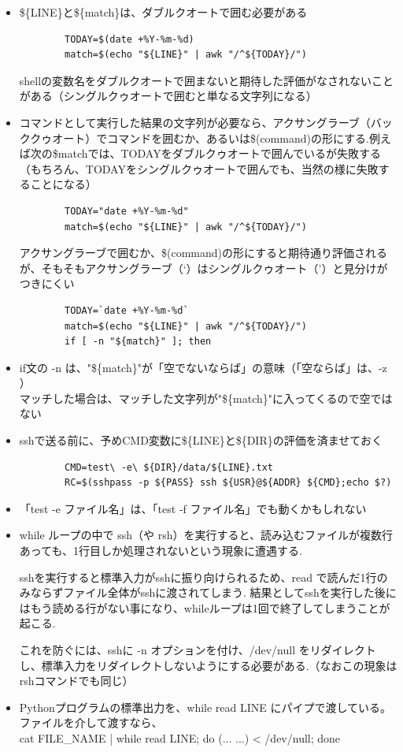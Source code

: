 \documentclass[12pt,a4paper,uplatex]{jsarticle}
\begin{document}
\begin{itemize}
	\item \$\{LINE\}と\$\{match\}は、ダブルクオートで囲む必要がある	
	\begin{verbatim}
		TODAY=$(date +%Y-%m-%d)
		match=$(echo "${LINE}" | awk "/^${TODAY}/")
	\end{verbatim}
	shellの変数名をダブルクオートで囲まないと期待した評価がなされないことがある（シングルクゥオートで囲むと単なる文字列になる）
	\item コマンドとして実行した結果の文字列が必要なら、アクサングラーブ（バッククゥオート）でコマンドを囲むか、あるいは\$(command)の形にする.例えば次の\${match}では、TODAYをダブルクゥオートで囲んでいるが失敗する（もちろん、TODAYをシングルクゥオートで囲んでも、当然の様に失敗することになる）
	\begin{verbatim}
		TODAY="date +%Y-%m-%d"
		match=$(echo "${LINE}" | awk "/^${TODAY}/")
	\end{verbatim}
	アクサングラーブで囲むか、\$(command)の形にすると期待通り評価されるが、そもそもアクサングラーブ（`）はシングルクゥオート（'）と見分けがつきにくい
	\begin{verbatim}
		TODAY=`date +%Y-%m-%d`
		match=$(echo "${LINE}" | awk "/^${TODAY}/")
		if [ -n "${match}" ]; then
	\end{verbatim}
	\item if文の -n は、"\$\{match\}"が「空でないならば」の意味（「空ならば」は、-z ）\\マッチした場合は、マッチした文字列が"\$\{match\}"に入ってくるので空ではない
	\item sshで送る前に、予めCMD変数に\$\{LINE\}と\$\{DIR\}の評価を済ませておく
	\begin{verbatim}
		CMD=test\ -e\ ${DIR}/data/${LINE}.txt
		RC=$(sshpass -p ${PASS} ssh ${USR}@${ADDR} ${CMD};echo $?)
	\end{verbatim}
	\item 「test -e ファイル名」は、「test -f ファイル名」でも動くかもしれない
	\item while ループの中で ssh（や rsh）を実行すると、読み込むファイルが複数行あっても、1行目しか処理されないという現象に遭遇する.
	
	sshを実行すると標準入力がsshに振り向けられるため、read で読んだ1行のみならずファイル全体がsshに渡されてしまう. 結果としてsshを実行した後にはもう読める行がない事になり、whileループは1回で終了してしまうことが起こる.
	
	これを防ぐには、sshに -n オプションを付け、/dev/null をリダイレクトし、標準入力をリダイレクトしないようにする必要がある.（なおこの現象はrshコマンドでも同じ）
	\item Pythonプログラムの標準出力を、while read LINE にパイプで渡している。ファイルを介して渡すなら、\\ cat FILE\_NAME | while read LINE; do (... ...) < /dev/null; done
\end{itemize}
\end{document}
